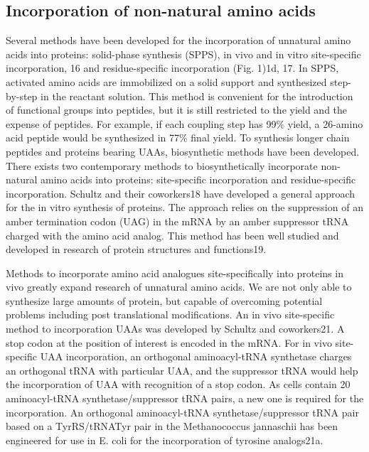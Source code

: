 \begin{refsection}
\subsection{Incorporation of non-natural amino acids}
\label{sec:rsi}

Several methods have been developed for the incorporation of unnatural amino
acids into proteins: solid-phase synthesis (SPPS)\cite{Mahto2011}, in vivo and in vitro
site-specific incorporation, 16 and residue-specific incorporation (Fig.
1)1d, 17. In SPPS, activated amino acids are immobilized on a solid support and
synthesized step-by-step in the reactant solution. This method is convenient
for the introduction of functional groups into peptides, but it is still
restricted to the yield and the expense of peptides. For example, if each
coupling step has 99\% yield, a 26-amino acid peptide would be synthesized in
77\% final yield. To synthesis longer chain peptides and proteins bearing UAAs,
biosynthetic methods have been developed.  There exists two contemporary
methods to biosynthetically incorporate non-natural amino acids into proteins:
site-specific incorporation and residue-specific incorporation. Schultz and
their coworkers18 have developed a general approach for the in vitro synthesis
of proteins. The approach relies on the suppression of an amber termination
codon (UAG) in the mRNA by an amber suppressor tRNA charged with the amino acid
analog. This method has been well studied and developed in research of protein
structures and functions19. 


Methods to incorporate amino acid analogues site-specifically into proteins in
vivo greatly expand research of unnatural amino acids. We are not only able to
synthesize large amounts of protein, but capable of overcoming potential
problems including post translational modifications. An in vivo site-specific
method to incorporation UAAs was developed by Schultz and coworkers21. A stop
codon at the position of interest is encoded in the mRNA. For in vivo
site-specific UAA incorporation, an orthogonal aminoacyl-tRNA synthetase
charges an orthogonal tRNA with particular UAA, and the suppressor tRNA would
help the incorporation of UAA with recognition of a stop codon. As cells
contain 20 aminoacyl-tRNA synthetase/suppressor tRNA pairs, a new one is
required for the incorporation. An orthogonal aminoacyl-tRNA
synthetase/suppressor tRNA pair based on a TyrRS/tRNATyr pair in the
Methanococcus jannaschii has been engineered for use in E. coli for the
incorporation of tyrosine analogs21a.


\end{refsection}
